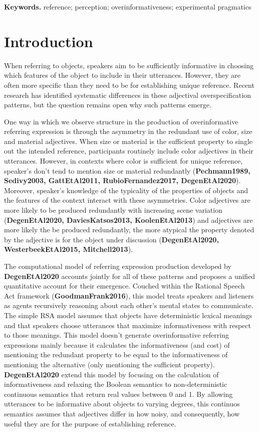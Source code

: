\documentclass[12pt,letterpaper]{article}
\newcommand{\citeA}{\textbf}
\newenvironment{keywords}{%
\vspace{.5em}
\noindent\begin{minipage}{1\textwidth}
\setlength{\leftskip}{0.4in}
\setlength{\rightskip}{0.4in}
\textbf{Keywords.}}
{\end{minipage}}
\begin{document}
\begin{keywords} %
reference; perception; overinformativeness; experimental pragmatics
\end{keywords}

\section{Introduction} 
When referring to objects, speakers aim to be sufficiently informative in choosing which features of the object to include in their utterances. However, they are often more specific than they need to be for establishing unique reference. Recent research has identified systematic differences in these adjectival overspecification patterns, but the question remains open why such patterns emerge.

One way in which we observe structure in the production of overinformative referring expression is through the asymmetry in the redundant use of color, size and material adjectives. When size or material is the sufficient property to single out the intended reference, participants routinely include color adjectives in their utterances. However, in contexts where color is sufficient for unique reference, speaker's don't tend to mention size or material redundantly (\citeA{Pechmann1989, Sedivy2003, GattEtAl2011, RubioFernandez2017, DegenEtAl2020}). Moreover, speaker's knowledge of the typicality of the properties of objects and the features of the context interact with these asymmetries. Color adjectives are more likely to be produced redundantly with increasing scene variation (\citeA{DegenEtAl2020, DaviesKatsos2013, KoolenEtAl2013}) and adjectives are more likely the be produced redundantly, the more atypical the property denoted by the adjective is for the object under discussion (\citeA{DegenEtAl2020, WesterbeekEtAl2015, Mitchell2013}).

The computational model of referring expression production developed by \citeA{DegenEtAl2020} accounts jointly for all of these patterns and proposes a unified quantitative account for their emergence. Couched within the Rational Speech Act framework (\citeA{GoodmanFrank2016}), this model treats speakers and listeners as agents recursively reasoning about each other's mental states to communicate. The simple RSA model assumes that objects have deterministic lexical meanings and that speakers choose utterances that maximize informativeness with respect to those meanings. This model doesn't generate overinformative referring expressions mainly because it calculates the informativeness (and cost) of mentioning the redundant property to be equal to the informativeness of mentioning the alternative (only mentioning the sufficient property). \citeA{DegenEtAl2020} extend this model by focusing on the calculation of informativeness and relaxing the Boolean semantics to non-deterministic continuous semantics that return real values between 0 and 1. By allowing utterances to be informative about objects to varying degrees, this continuos semantics assumes that adjectives differ in how noisy, and consequently, how useful they are for the purpose of establishing reference. 
\end{document}
